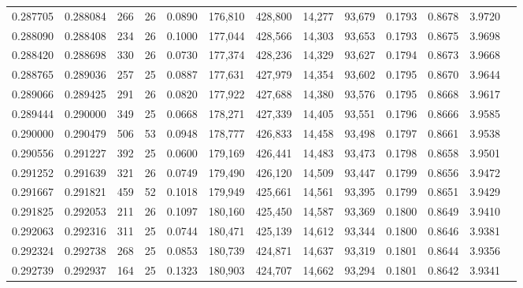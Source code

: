 \begin{tabular}{rrrrrrrrrrrrr}
0.287705 & 0.288084 &    266 &    26 &                                     0.0890 & 176,810 & 428,800 &  14,277 &  93,679 & 0.1793 & 0.8678 & 3.9720 \\
0.288090 & 0.288408 &    234 &    26 &                                     0.1000 & 177,044 & 428,566 &  14,303 &  93,653 & 0.1793 & 0.8675 & 3.9698 \\
0.288420 & 0.288698 &    330 &    26 &                                     0.0730 & 177,374 & 428,236 &  14,329 &  93,627 & 0.1794 & 0.8673 & 3.9668 \\
0.288765 & 0.289036 &    257 &    25 &                                     0.0887 & 177,631 & 427,979 &  14,354 &  93,602 & 0.1795 & 0.8670 & 3.9644 \\
0.289066 & 0.289425 &    291 &    26 &                                     0.0820 & 177,922 & 427,688 &  14,380 &  93,576 & 0.1795 & 0.8668 & 3.9617 \\
0.289444 & 0.290000 &    349 &    25 &                                     0.0668 & 178,271 & 427,339 &  14,405 &  93,551 & 0.1796 & 0.8666 & 3.9585 \\
0.290000 & 0.290479 &    506 &    53 &                                     0.0948 & 178,777 & 426,833 &  14,458 &  93,498 & 0.1797 & 0.8661 & 3.9538 \\
0.290556 & 0.291227 &    392 &    25 &                                     0.0600 & 179,169 & 426,441 &  14,483 &  93,473 & 0.1798 & 0.8658 & 3.9501 \\
0.291252 & 0.291639 &    321 &    26 &                                     0.0749 & 179,490 & 426,120 &  14,509 &  93,447 & 0.1799 & 0.8656 & 3.9472 \\
0.291667 & 0.291821 &    459 &    52 &                                     0.1018 & 179,949 & 425,661 &  14,561 &  93,395 & 0.1799 & 0.8651 & 3.9429 \\
0.291825 & 0.292053 &    211 &    26 &                                     0.1097 & 180,160 & 425,450 &  14,587 &  93,369 & 0.1800 & 0.8649 & 3.9410 \\
0.292063 & 0.292316 &    311 &    25 &                                     0.0744 & 180,471 & 425,139 &  14,612 &  93,344 & 0.1800 & 0.8646 & 3.9381 \\
0.292324 & 0.292738 &    268 &    25 &                                     0.0853 & 180,739 & 424,871 &  14,637 &  93,319 & 0.1801 & 0.8644 & 3.9356 \\
0.292739 & 0.292937 &    164 &    25 &                                     0.1323 & 180,903 & 424,707 &  14,662 &  93,294 & 0.1801 & 0.8642 & 3.9341 \\

\end{tabular}
